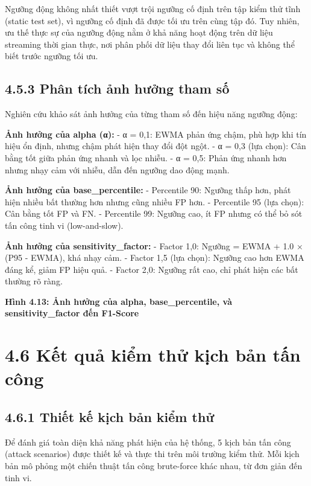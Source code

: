 \documentclass[
  a4paper]{report}
\begin{document}
Ngưỡng động không nhất thiết vượt trội ngưỡng cố định trên tập kiểm thử
tĩnh (static test set), vì ngưỡng cố định đã được tối ưu trên cùng tập
đó. Tuy nhiên, ưu thế thực sự của ngưỡng động nằm ở khả năng hoạt động
trên dữ liệu streaming thời gian thực, nơi phân phối dữ liệu thay đổi
liên tục và không thể biết trước ngưỡng tối ưu.

\subsection{4.5.3 Phân tích ảnh hưởng tham
số}\label{phuxe2n-tuxedch-ux1ea3nh-hux1b0ux1edfng-tham-sux1ed1}

Nghiên cứu khảo sát ảnh hưởng của từng tham số đến hiệu năng ngưỡng
động:

\textbf{Ảnh hưởng của alpha (α):} - α = 0,1: EWMA phản ứng chậm, phù hợp
khi tín hiệu ổn định, nhưng chậm phát hiện thay đổi đột ngột. - α = 0,3
(lựa chọn): Cân bằng tốt giữa phản ứng nhanh và lọc nhiễu. - α = 0,5:
Phản ứng nhanh hơn nhưng nhạy cảm với nhiễu, dẫn đến ngưỡng dao động
mạnh.

\textbf{Ảnh hưởng của base\_percentile:} - Percentile 90: Ngưỡng thấp
hơn, phát hiện nhiều bất thường hơn nhưng cũng nhiều FP hơn. -
Percentile 95 (lựa chọn): Cân bằng tốt FP và FN. - Percentile 99: Ngưỡng
cao, ít FP nhưng có thể bỏ sót tấn công tinh vi (low-and-slow).

\textbf{Ảnh hưởng của sensitivity\_factor:} - Factor 1,0: Ngưỡng = EWMA
+ 1.0 × (P95 - EWMA), khá nhạy cảm. - Factor 1,5 (lựa chọn): Ngưỡng cao
hơn EWMA đáng kể, giảm FP hiệu quả. - Factor 2,0: Ngưỡng rất cao, chỉ
phát hiện các bất thường rõ ràng.

\textbf{Hình 4.13: Ảnh hưởng của alpha, base\_percentile, và
sensitivity\_factor đến F1-Score}

\section{4.6 Kết quả kiểm thử kịch bản tấn
công}\label{kux1ebft-quux1ea3-kiux1ec3m-thux1eed-kux1ecbch-bux1ea3n-tux1ea5n-cuxf4ng}

\subsection{4.6.1 Thiết kế kịch bản kiểm
thử}\label{thiux1ebft-kux1ebf-kux1ecbch-bux1ea3n-kiux1ec3m-thux1eed}

Để đánh giá toàn diện khả năng phát hiện của hệ thống, 5 kịch bản tấn
công (attack scenarios) được thiết kế và thực thi trên môi trường kiểm
thử. Mỗi kịch bản mô phỏng một chiến thuật tấn công brute-force khác
nhau, từ đơn giản đến tinh vi.
\end{document}
